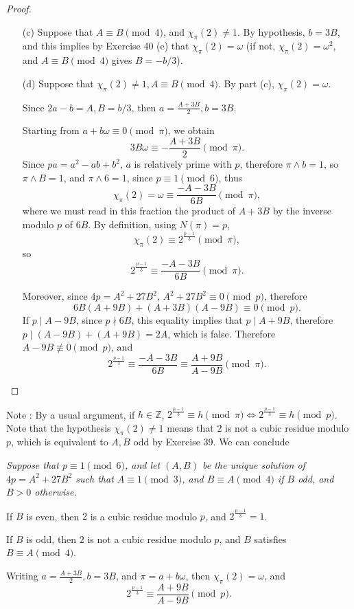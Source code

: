 \documentclass[11pt,a4paper]{article}
\newcommand{\Z}{\mathbb{Z}}
\begin{document}
\begin{proof}
\begin{enumerate}
\item[(c)] Suppose that $A\equiv B \pmod 4$, and $\chi_\pi(2)\ne 1$. By hypothesis, $b = 3B$, and this implies by Exercise 40 (e) that $\chi_\pi(2) = \omega$ (if not, $\chi_\pi(2) = \omega^2$, and $A\equiv B \pmod 4$ gives $B = -b/3$).

\item[(d)] Suppose that $\chi_\pi(2) \ne 1, A\equiv B \pmod 4$. By part (c), $\chi_\pi(2) = \omega$.

Since $2a-b = A, B = b/3$, then $a = \frac{A+3B}{2}, b = 3B$.

Starting from $a + b \omega \equiv 0 \pmod \pi$, we obtain
$$ 3B \omega \equiv -\frac{A+3B}{2} \pmod \pi.$$
Since $pa = a^2 - ab + b^2$, $a$ is relatively prime with $p$, therefore $\pi \wedge b = 1$, so $\pi \wedge B = 1$, and $\pi \wedge 6 = 1$, since $p \equiv 1 \pmod 6$, thus
$$\chi_\pi(2)  = \omega \equiv \frac{-A-3B}{6B} \pmod \pi,$$
where we must read in this fraction the product of $A + 3B$ by the inverse modulo $p$ of $6B$.
By definition, using $N(\pi) = p$, 
$$\chi_\pi(2) \equiv 2^\frac{p-1}{3} \pmod \pi,$$
so
$$2^{\frac{p-1}{3}} \equiv \frac{-A-3B}{6B}  \pmod \pi.$$

Moreover, since  $4p = A^2 + 27 B^2$, $A^2 + 27 B^2 \equiv 0 \pmod p$, therefore
$$ 6B(A+9B) + (A+3B)(A-9B) \equiv 0 \pmod p.$$
If $p \mid A-9B$, since $p \nmid 6B$, this equality implies that $p\mid A+9B$, therefore $p \mid (A-9B) + (A+9B) = 2A$, which is false. Therefore $A-9B \not \equiv 0 \pmod p$, and
$$2^{\frac{p-1}{3}} \equiv \frac{-A-3B}{6B}  \equiv \frac{A+9B}{A-9B} \pmod \pi.$$
\end{enumerate}

\end{proof}

Note : By a usual argument, if $h \in \Z$, $2^{\frac{p-1}{3}} \equiv h \pmod \pi \iff 2^{\frac{p-1}{3}} \equiv h \pmod p$. Note that the hypothesis $\chi_\pi(2) \ne 1$ means that $2$ is not a cubic residue modulo $p$, which is equivalent to $A,B$ odd by Exercise 39. We can conclude

\bigskip

{\it
Suppose that $p \equiv 1 \pmod 6$, and let $(A,B)$ be the unique solution of $4p = A^2 + 27 B^2$ such that $A \equiv 1 \pmod 3$, and $B\equiv A \pmod 4$ if $B$ odd, and $B>0$ otherwise.

If $B$ is even, then $2$ is a cubic residue modulo $p$, and $2^\frac{p-1}{3} = 1$.

If $B$ is odd, then $2$ is not a cubic residue modulo $p$, and $B$ satisfies $B \equiv A \pmod 4$. 

Writing $a = \frac{A+3B}{2}, b = 3B$, and $\pi = a + b \omega$, then  $\chi_\pi(2) = \omega$, and
$$2^{\frac{p-1}{3}}  \equiv \frac{A+9B}{A-9B} \pmod p.$$
}
\end{document}
